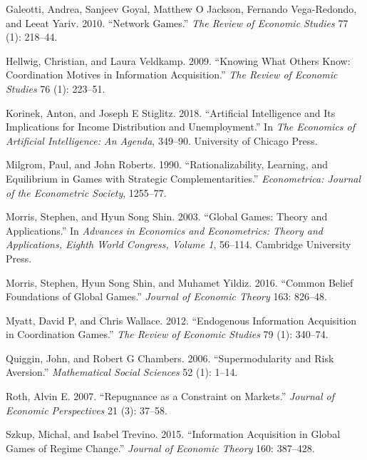 \documentclass[
]{article}
\newlength{\cslhangindent}
\newenvironment{CSLReferences}[2] %
 {\begin{list}{}{%
  \setlength{\itemindent}{0pt}
  \setlength{\leftmargin}{0pt}
  \setlength{\parsep}{0pt}
  \ifodd #1
   \setlength{\leftmargin}{\cslhangindent}
   \setlength{\itemindent}{-1\cslhangindent}
  \fi
  \setlength{\itemsep}{#2\baselineskip}}}
 {\end{list}}
\theoremstyle{definition}
\theoremstyle{plain}
\theoremstyle{remark}
\begin{document}
\begin{CSLReferences}{1}{0}
Galeotti, Andrea, Sanjeev Goyal, Matthew O Jackson, Fernando
Vega-Redondo, and Leeat Yariv. 2010. {``Network Games.''} \emph{The
Review of Economic Studies} 77 (1): 218--44.

Hellwig, Christian, and Laura Veldkamp. 2009. {``Knowing What Others
Know: Coordination Motives in Information Acquisition.''} \emph{The
Review of Economic Studies} 76 (1): 223--51.

Korinek, Anton, and Joseph E Stiglitz. 2018. {``Artificial Intelligence
and Its Implications for Income Distribution and Unemployment.''} In
\emph{The Economics of Artificial Intelligence: An Agenda}, 349--90.
University of Chicago Press.

Milgrom, Paul, and John Roberts. 1990. {``Rationalizability, Learning,
and Equilibrium in Games with Strategic Complementarities.''}
\emph{Econometrica: Journal of the Econometric Society}, 1255--77.

Morris, Stephen, and Hyun Song Shin. 2003. {``Global Games: Theory and
Applications.''} In \emph{Advances in Economics and Econometrics: Theory
and Applications, Eighth World Congress, Volume 1}, 56--114. Cambridge
University Press.

Morris, Stephen, Hyun Song Shin, and Muhamet Yildiz. 2016. {``Common
Belief Foundations of Global Games.''} \emph{Journal of Economic Theory}
163: 826--48.

Myatt, David P, and Chris Wallace. 2012. {``Endogenous Information
Acquisition in Coordination Games.''} \emph{The Review of Economic
Studies} 79 (1): 340--74.

Quiggin, John, and Robert G Chambers. 2006. {``Supermodularity and Risk
Aversion.''} \emph{Mathematical Social Sciences} 52 (1): 1--14.

Roth, Alvin E. 2007. {``Repugnance as a Constraint on Markets.''}
\emph{Journal of Economic Perspectives} 21 (3): 37--58.

Szkup, Michal, and Isabel Trevino. 2015. {``Information Acquisition in
Global Games of Regime Change.''} \emph{Journal of Economic Theory} 160:
387--428.


\end{CSLReferences}
\end{document}
